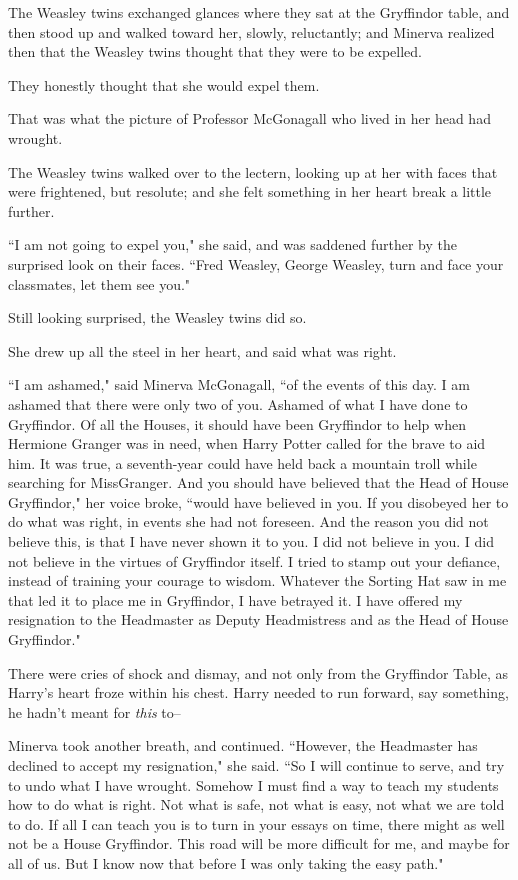 The Weasley twins exchanged glances where they sat at the Gryffindor table, and then stood up and walked toward her, slowly, reluctantly; and Minerva realized then that the Weasley twins thought that they were to be expelled.

They honestly thought that she would expel them.

That was what the picture of Professor McGonagall who lived in her head had wrought.

The Weasley twins walked over to the lectern, looking up at her with faces that were frightened, but resolute; and she felt something in her heart break a little further.

``I am not going to expel you," she said, and was saddened further by the surprised look on their faces. ``Fred Weasley, George Weasley, turn and face your classmates, let them see you."

Still looking surprised, the Weasley twins did so.

She drew up all the steel in her heart, and said what was right.

``I am ashamed," said Minerva McGonagall, ``of the events of this day. I am ashamed that there were only two of you. Ashamed of what I have done to Gryffindor. Of all the Houses, it should have been Gryffindor to help when Hermione Granger was in need, when Harry Potter called for the brave to aid him. It was true, a seventh-year could have held back a mountain troll while searching for Miss\?Granger. And you should have believed that the Head of House Gryffindor," her voice broke, ``would have believed in you. If you disobeyed her to do what was right, in events she had not foreseen. And the reason you did not believe this, is that I have never shown it to you. I did not believe in you. I did not believe in the virtues of Gryffindor itself. I tried to stamp out your defiance, instead of training your courage to wisdom. Whatever the Sorting Hat saw in me that led it to place me in Gryffindor, I have betrayed it. I have offered my resignation to the Headmaster as Deputy Headmistress and as the Head of House Gryffindor."

\later

There were cries of shock and dismay, and not only from the Gryffindor Table, as Harry's heart froze within his chest. Harry needed to run forward, say something, he hadn't meant for \emph{this} to\---

\later

Minerva took another breath, and continued. ``However, the Headmaster has declined to accept my resignation," she said. ``So I will continue to serve, and try to undo what I have wrought. Somehow I must find a way to teach my students how to do what is right. Not what is safe, not what is easy, not what we are told to do. If all I can teach you is to turn in your essays on time, there might as well not be a House Gryffindor. This road will be more difficult for me, and maybe for all of us. But I know now that before I was only taking the easy path."

